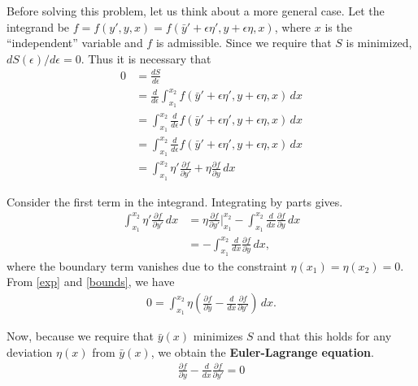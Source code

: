 \documentclass{article}
\newcommand{\p}{\partial}
\newcommand{\f}[2]{\frac{#1}{#2}}
\newcommand{\lp}{\left(}
\newcommand{\rp}{\right)}
\begin{document}
Before solving this problem, let us think about a more general case. Let the integrand be $f = f(y',y,x) = f(\bar{y}'+\epsilon\eta',y+\epsilon\eta,x)$, where $x$ is the ``independent'' variable and $f$ is admissible. Since we require that $S$ is minimized, $dS(\epsilon)/d\epsilon = 0$. Thus it is necessary that
\begin{align}\label{exp}
0 &= \f{dS}{d\epsilon} \nonumber\\ 
&= \f{d}{d\epsilon}\int^{x_2}_{x_1}f(\bar{y}'+\epsilon\eta',y+\epsilon\eta,x)\,dx \nonumber\\
&= \int^{x_2}_{x_1}\f{d}{d\epsilon}f(\bar{y}'+\epsilon\eta',y+\epsilon\eta,x)\,dx \nonumber\\
&= \int^{x_2}_{x_1}\f{d}{d\epsilon}f(\bar{y}'+\epsilon\eta',y+\epsilon\eta,x)\,dx \nonumber\\
&= \int^{x_2}_{x_1}\eta'\f{\p f}{\p y'} + \eta\f{\p f}{\p y}\,dx 
\end{align}

Consider the first term in the integrand. Integrating by parts gives.
\begin{align}\label{bounds}
\int^{x_2}_{x_1}\eta'\f{\p f}{\p y'} \,dx
&= \eta\f{\p f}{\p y'}\bigg\vert_{x_1}^{x_2} -  \int^{x_2}_{x_1}  \f{d}{dx}\f{\p f}{\p y} \,dx \nonumber\\
&= -  \int^{x_2}_{x_1}  \f{d}{dx}\f{\p f}{\p y} \,dx,
\end{align} 
where the boundary term vanishes due to the constraint $\eta(x_1) = \eta(x_2) = 0$. From \eqref{exp} and \eqref{bounds}, we have
\begin{align}
0 = \int^{x_2}_{x_1} \eta\lp \f{\p f}{\p y} - \f{d}{dx}\f{\p f}{\p y'}  \rp\,dx. 
\end{align}

Now, because we require that $\bar{y}(x)$ minimizes $S$ and that this holds for any deviation $\eta(x)$ from $\bar{y}(x)$, we obtain the \textbf{Euler-Lagrange equation}. 
\begin{align}
\boxed{\f{\p f}{\p y} - \f{d}{dx}\f{\p f}{\p y'} = 0}
\end{align}
\end{document}

